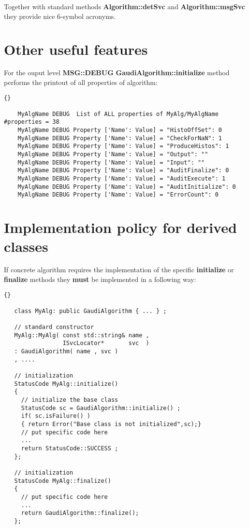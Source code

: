 \documentclass{lhcbnote}
\newcommand{\bftt}         {\ttfamily\bfseries}
\begin{document}
Together with standard methods {\bftt{Algorithm::detSvc}} and
{\bftt{Algorithm::msgSvc}} they provide nice 6-symbol acronyms.


\section{Other useful features}
For the ouput level {\bftt{MSG::DEBUG}}
{\bftt{GaudiAlgorithm::initialize}} method performs the
printout of all properties of algorithm:

\begin{scriptsize}
  \begin{lstlisting}{}

    MyAlgName DEBUG  List of ALL properties of MyAlg/MyAlgName   #properties = 38
    MyAlgName DEBUG Property ['Name': Value] = "HistoOffSet": 0
    MyAlgName DEBUG Property ['Name': Value] = "CheckForNaN": 1
    MyAlgName DEBUG Property ['Name': Value] = "ProduceHistos": 1
    MyAlgName DEBUG Property ['Name': Value] = "Output": ""
    MyAlgName DEBUG Property ['Name': Value] = "Input": ""
    MyAlgName DEBUG Property ['Name': Value] = "AuditFinalize": 0
    MyAlgName DEBUG Property ['Name': Value] = "AuditExecute": 1
    MyAlgName DEBUG Property ['Name': Value] = "AuditInitialize": 0
    MyAlgName DEBUG Property ['Name': Value] = "ErrorCount": 0

  \end{lstlisting}
\end{scriptsize}


\section{Implementation policy for derived classes}
If concrete algorithm requires the implementation of
the specific {\bftt{initialize}} or
{\bftt{finalize}} methods they {\bftt{must}} be implemented
in a following way:

\begin{scriptsize}
 \begin{lstlisting}{}

   class MyAlg: public GaudiAlgorithm { ... } ;

   // standard constructor
   MyAlg::MyAlg( const std::string& name ,
                 ISvcLocator*       svc  )
   : GaudiAlgorithm( name , svc )
   , ....

   // initialization
   StatusCode MyAlg::initialize()
   {
     // initialize the base class
     StatusCode sc = GaudiAlgorithm::initialize() ;
     if( sc.isFailure() )
     { return Error("Base class is not initialized",sc);}
     // put specific code here
     ...
     return StatusCode::SUCCESS ;
   };

   // initialization
   StatusCode MyAlg::finalize()
   {
     // put specific code here
     ...
     return GaudiAlgorithm::finalize();
   };

 \end{lstlisting}
\end{scriptsize}
\end{document}
